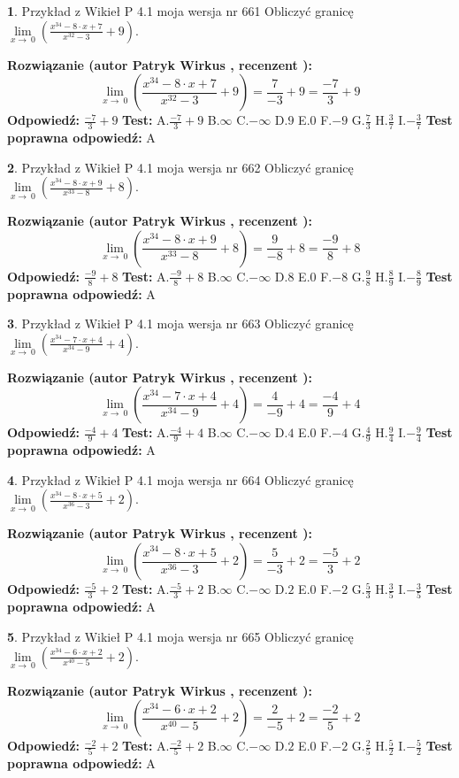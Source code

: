 \documentclass[12pt, a4paper]{article}
\theoremstyle{definition} %
\newtheorem{zad}{}
\newcommand{\zadStart}[1]{\begin{zad}#1\newline}
\newcommand{\zadStop}{\end{zad}}
\newcommand{\rozwStart}[2]{\noindent \textbf{Rozwiązanie (autor #1 , recenzent #2): }\newline}
\newcommand{\rozwStop}{\newline}
\newcommand{\odpStart}{\noindent \textbf{Odpowiedź:}\newline}
\newcommand{\odpStop}{\newline}
\newcommand{\testStart}{\noindent \textbf{Test:}\newline}
\newcommand{\testStop}{\newline}
\newcommand{\kluczStart}{\noindent \textbf{Test poprawna odpowiedź:}\newline}
\newcommand{\kluczStop}{\newline}
\begin{document}
\zadStart{Przykład z Wikieł P 4.1 moja wersja nr 661}
Obliczyć granicę $\lim\limits_{x\to\ 0}(\frac{x^{34}-8 \cdot x +7}{x^{32}-3}+9)$.
\zadStop
\rozwStart{Patryk Wirkus}{}
$$\lim\limits_{x\to\ 0}(\frac{x^{34}-8 \cdot x +7}{x^{32}-3}+9)=\frac{7}{-3}+9=\frac{-7}{3}+9$$
\rozwStop
\odpStart
$\frac{-7}{3}+9$
\odpStop
\testStart
A.$\frac{-7}{3}+9$
B.$\infty$
C.$-\infty$
D.$9$
E.$0$
F.$-9$
G.$\frac{7}{3}$
H.$\frac{3}{7}$
I.$-\frac{3}{7}$
\testStop
\kluczStart
A
\kluczStop



\zadStart{Przykład z Wikieł P 4.1 moja wersja nr 662}
Obliczyć granicę $\lim\limits_{x\to\ 0}(\frac{x^{34}-8 \cdot x +9}{x^{33}-8}+8)$.
\zadStop
\rozwStart{Patryk Wirkus}{}
$$\lim\limits_{x\to\ 0}(\frac{x^{34}-8 \cdot x +9}{x^{33}-8}+8)=\frac{9}{-8}+8=\frac{-9}{8}+8$$
\rozwStop
\odpStart
$\frac{-9}{8}+8$
\odpStop
\testStart
A.$\frac{-9}{8}+8$
B.$\infty$
C.$-\infty$
D.$8$
E.$0$
F.$-8$
G.$\frac{9}{8}$
H.$\frac{8}{9}$
I.$-\frac{8}{9}$
\testStop
\kluczStart
A
\kluczStop



\zadStart{Przykład z Wikieł P 4.1 moja wersja nr 663}
Obliczyć granicę $\lim\limits_{x\to\ 0}(\frac{x^{34}-7 \cdot x +4}{x^{34}-9}+4)$.
\zadStop
\rozwStart{Patryk Wirkus}{}
$$\lim\limits_{x\to\ 0}(\frac{x^{34}-7 \cdot x +4}{x^{34}-9}+4)=\frac{4}{-9}+4=\frac{-4}{9}+4$$
\rozwStop
\odpStart
$\frac{-4}{9}+4$
\odpStop
\testStart
A.$\frac{-4}{9}+4$
B.$\infty$
C.$-\infty$
D.$4$
E.$0$
F.$-4$
G.$\frac{4}{9}$
H.$\frac{9}{4}$
I.$-\frac{9}{4}$
\testStop
\kluczStart
A
\kluczStop



\zadStart{Przykład z Wikieł P 4.1 moja wersja nr 664}
Obliczyć granicę $\lim\limits_{x\to\ 0}(\frac{x^{34}-8 \cdot x +5}{x^{36}-3}+2)$.
\zadStop
\rozwStart{Patryk Wirkus}{}
$$\lim\limits_{x\to\ 0}(\frac{x^{34}-8 \cdot x +5}{x^{36}-3}+2)=\frac{5}{-3}+2=\frac{-5}{3}+2$$
\rozwStop
\odpStart
$\frac{-5}{3}+2$
\odpStop
\testStart
A.$\frac{-5}{3}+2$
B.$\infty$
C.$-\infty$
D.$2$
E.$0$
F.$-2$
G.$\frac{5}{3}$
H.$\frac{3}{5}$
I.$-\frac{3}{5}$
\testStop
\kluczStart
A
\kluczStop



\zadStart{Przykład z Wikieł P 4.1 moja wersja nr 665}
Obliczyć granicę $\lim\limits_{x\to\ 0}(\frac{x^{34}-6 \cdot x +2}{x^{40}-5}+2)$.
\zadStop
\rozwStart{Patryk Wirkus}{}
$$\lim\limits_{x\to\ 0}(\frac{x^{34}-6 \cdot x +2}{x^{40}-5}+2)=\frac{2}{-5}+2=\frac{-2}{5}+2$$
\rozwStop
\odpStart
$\frac{-2}{5}+2$
\odpStop
\testStart
A.$\frac{-2}{5}+2$
B.$\infty$
C.$-\infty$
D.$2$
E.$0$
F.$-2$
G.$\frac{2}{5}$
H.$\frac{5}{2}$
I.$-\frac{5}{2}$
\testStop
\kluczStart
A
\kluczStop
\end{document}
